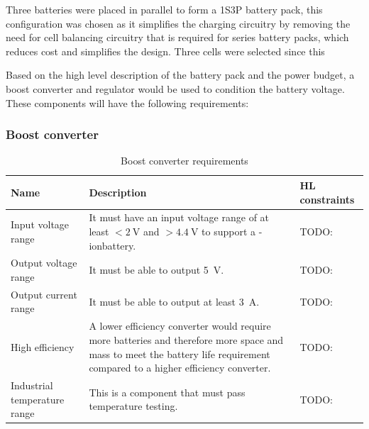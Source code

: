 \documentclass{report}
\newcommand{\liion}{\ce{Li}-ion}
\begin{document}
Three batteries were placed in parallel to form a 1S3P battery pack, this configuration was chosen as it simplifies the charging circuitry by removing the need for cell balancing circuitry that is required for series battery packs, which reduces cost and simplifies the design. Three cells were selected since this %

Based on the high level description of the battery pack and the power budget, a boost converter and regulator would be used to condition the battery voltage. These components will have the following requirements:

\subsubsection{Boost converter}

\begin{table}[H]
  \centering
  \begin{tabular}{|p{}|p{}|p{}|}
    \hline
    \textbf{Name}                & \textbf{Description}                                                                                                                                                        & \textbf{HL constraints} \\ \hline
    Input voltage range          & It must have an input voltage range of at least $<\SI{2}{\volt}$ and $>\SI{4.4}{\volt}$ to support a \liion battery.                                                        & TODO:                   \\\hline
    Output voltage range         & It must be able to output \SI{5}{\volt}.                                                                                                                                    & TODO:                   \\\hline
    Output current range         & It must be able to output at least \SI{3}{\ampere}.                                                                                                                         & TODO:                   \\\hline
    High efficiency              & A lower efficiency converter would require more batteries and therefore more space and mass to meet the battery life requirement compared to a higher efficiency converter. & TODO:                   \\\hline
    Industrial temperature range & This is a component that must pass temperature testing.                                                                                                                     & TODO:                   \\\hline
  \end{tabular}
  \caption{Boost converter requirements}
  \label{tabl:boost-requirements}
\end{table}
\end{document}
